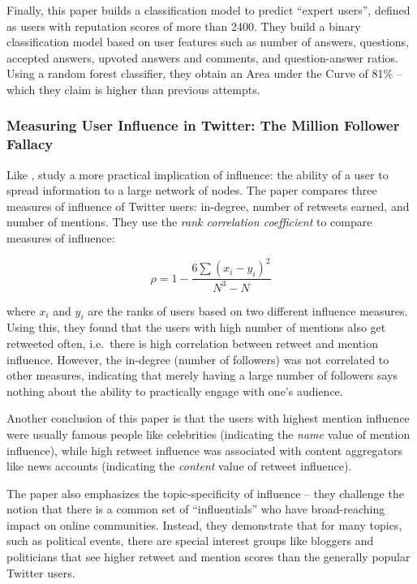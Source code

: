 \documentclass[10pt]{article}
\begin{document}
Finally, this paper builds a classification model to predict ``expert users'',
defined as users with reputation scores of more than 2400. They build a
binary classification model based on user features such as number of answers,
questions, accepted answers, upvoted answers and comments, and question-answer
ratios. Using a random forest classifier, they obtain an Area
under the Curve of 81\% -- which they claim is higher than previous attempts.


\subsubsection{Measuring User Influence in Twitter: The Million Follower Fallacy
  \citep{cha2010measuring}}

Like \cite{bakshy2011everyone}, \citet{cha2010measuring} study a more practical
implication of influence: the ability of a user to spread information to a
large network of nodes. The paper compares three measures of influence of
Twitter users: in-degree, number of retweets earned, and number of mentions.
They use the \textit{rank correlation coefficient} to compare measures of
influence:

\begin{equation}
  \rho = 1 - \frac{6\sum{(x_i - y_i)^2}}{N^3 - N}
\end{equation}

where $x_i$ and $y_i$ are the ranks of users based on two different influence
measures. Using this, they found that the users with high number of mentions
also get retweeted often, i.e.\ there is high correlation between retweet and
mention influence. However, the in-degree (number of followers) was not
correlated to other measures, indicating that merely having a large number of
followers says nothing about the ability to practically engage with one's
audience.

Another conclusion of this paper is that the users with highest mention
influence were usually famous people like celebrities (indicating the
\emph{name} value of mention influence), while high retweet influence was
associated with content aggregators like news accounts (indicating the
\emph{content} value of retweet influence).

The paper also emphasizes the topic-specificity of influence -- they challenge
the notion that there is a common set of ``influentials'' who have
broad-reaching impact on online communities. Instead, they demonstrate that for
many topics, such as political events, there are special interest groups like
bloggers and politicians that see higher retweet and mention scores than the
generally popular Twitter users.
\end{document}
